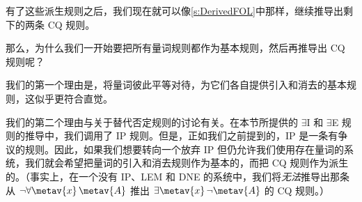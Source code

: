 有了这些派生规则之后，我们现在就可以像\cref{s:DerivedFOL}中那样，继续推导出剩下的两条 CQ 规则。

那么，为什么我们一开始要把所有量词规则都作为基本规则，然后再推导出 CQ 规则呢？

我们的第一个理由是，将量词彼此平等对待，为它们各自提供引入和消去的基本规则，这似乎更符合直觉。

我们的第二个理由与关于替代否定规则的讨论有关。在本节所提供的 $\exists$I 和 $\exists$E 规则的推导中，我们调用了 IP 规则。但是，正如我们之前提到的，IP 是一条有争议的规则。因此，如果我们想要转向一个放弃 IP 但仍允许我们使用存在量词的系统，我们就会希望把量词的引入和消去规则作为基本的，而把 CQ 规则作为派生的。（事实上，在一个没有 IP、LEM 和 DNE 的系统中，我们将\emph{无法}推导出那条从 $\enot \forall \metav{x}\, \metav{A}$ 推出 $\exists \metav{x}\, \enot \metav{A}$ 的 CQ 规则。）